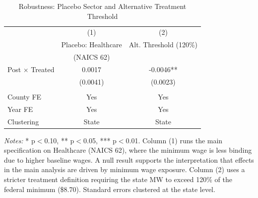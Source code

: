 
\begin{table}[H]
\centering
\caption{Robustness: Placebo Sector and Alternative Treatment Threshold}
\label{tab:robust}
\begin{threeparttable}
\begin{tabular}{lcc}
\toprule
 & (1) & (2) \\
 & Placebo: Healthcare & Alt. Threshold (120\%) \\
 & (NAICS 62) & \\
\midrule
Post $\times$ Treated & 0.0017 & -0.0046** \\
 & (0.0041) & (0.0023) \\
\\
County FE & Yes & Yes \\
Year FE & Yes & Yes \\
Clustering & State & State \\
\bottomrule
\end{tabular}
\begin{tablenotes}[flushleft]
\small
\item \textit{Notes:} * p$<$0.10, ** p$<$0.05, *** p$<$0.01. Column (1) runs the main specification on Healthcare (NAICS 62), where the minimum wage is less binding due to higher baseline wages. A null result supports the interpretation that effects in the main analysis are driven by minimum wage exposure. Column (2) uses a stricter treatment definition requiring the state MW to exceed 120\% of the federal minimum (\$8.70). Standard errors clustered at the state level.
\end{tablenotes}
\end{threeparttable}
\end{table}

